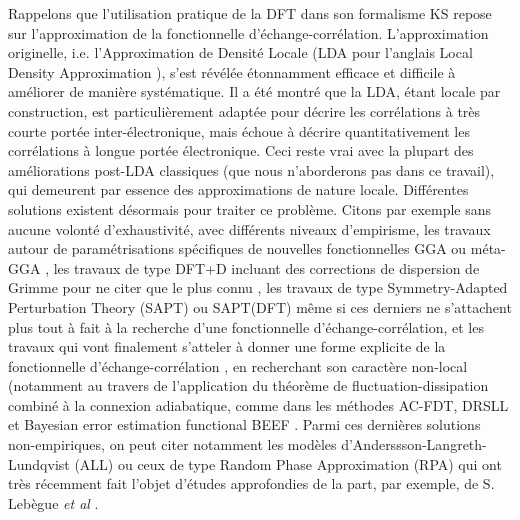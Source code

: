 	Rappelons que l’utilisation pratique de la DFT dans son formalisme KS repose sur l’approximation de la fonctionnelle d’échange-corrélation. L’approximation originelle, i.e. l’Approximation de Densité Locale (LDA pour l’anglais \og Local Density Approximation \fg), s’est révélée étonnamment efficace et difficile à améliorer de manière systématique. Il a été montré que la LDA, étant locale par construction, est particulièrement adaptée pour décrire les corrélations à très courte portée inter-électronique, mais échoue à décrire quantitativement les corrélations à longue portée électronique. Ceci reste vrai avec la plupart des améliorations post-LDA classiques (que nous n’aborderons pas dans ce travail), qui demeurent par essence des approximations de nature locale. Différentes solutions existent désormais pour traiter ce problème. Citons par exemple sans aucune volonté d’exhaustivité, avec différents niveaux d’empirisme, les travaux autour de paramétrisations spécifiques de nouvelles fonctionnelles GGA ou méta-GGA \cite{valero2006nonadiabatic}, les travaux de type DFT+D incluant des corrections de dispersion de Grimme pour ne citer que le plus connu \cite{grimme2006semiempirical,grimme2010consistent}, les travaux de type Symmetry-Adapted Perturbation Theory (SAPT) ou SAPT(DFT) même si ces derniers ne s’attachent plus tout à fait à la recherche d’une fonctionnelle d’échange-corrélation, et les travaux qui vont finalement s’atteler à donner une forme explicite de la fonctionnelle d’échange-corrélation \cite{klimevs2012perspective,tran2013nonlocal}, en recherchant son caractère non-local (notamment au travers de l’application du théorème de fluctuation-dissipation combiné à la connexion adiabatique, comme dans les méthodes AC-FDT, DRSLL \cite{dion2004van,wellendorff2012density}  et Bayesian error estimation functional BEEF \cite{wellendorff2012density}. Parmi ces dernières solutions non-empiriques, on peut citer notamment les modèles d’Anderssson-Langreth-Lundqvist (ALL) ou ceux de type Random Phase Approximation (RPA) qui ont très récemment fait l’objet d’études approfondies de la part, par exemple, de S. Lebègue \textit{et al} \cite{lebegue2010cohesive,mussard2013modelisations}.\\
	
